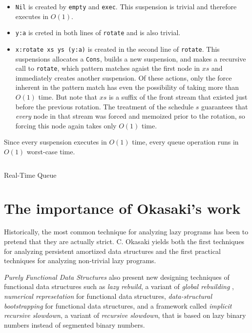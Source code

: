 \documentclass[12pt, a4paper]{article} %
\newcommand{\code}[1]{\texttt{#1}} %
\begin{document}
\begin{itemize}
  \item \code{Nil} is created by \code{empty} and \code{exec}. This suspension is trivial and therefore executes in $O(1)$.
  \item \code{y:a} is creted in both lines of \code{rotate} and is also trivial.
  \item \code{x:rotate xs ys (y:a)} is created in the second line of \code{rotate}. This suspensions allocates a \code{Cons}, builds a new suspension, and makes a recursive call to \code{rotate}, which pattern matches agaist the first node in $xs$ and immediately creates another suspension. Of these actions, only the force inherent in the pattern match has even the possibility of taking more than $O(1)$ time. But note that $xs$ is a suffix of the front stream that existed just before the previous rotation. The treatment of the schedule $s$ guarantees that \textit{every} node in that stream was forced and memoized prior to the rotation, so forcing this node again takes only $O(1)$ time.
\end{itemize}

Since every suspension executes in $O(1)$ time, every queue operation runs in $O(1)$ worst-case time.

\begin{listing}[H]
    \inputminted[breaklines=true,fontsize=\footnotesize]{haskell}{../../Chapter7/RealTimeQueue.hs}
    \caption{Real-Time Queue}
    \label{lst:Real-Time Queue}
\end{listing}





\section{The importance of Okasaki's work}%
\label{sec:importance}

Historically, the most common technique for analyzing lazy programs has been to pretend that they are actually strict.
C. Okasaki yields both the first techniques for analyzing persistent amortized data structures and the first practical techniques for analyzing non-trivial lazy programs.

\textit{Purely Functional Data Structures} also present new designing techniques of functional data structures such as \textit{lazy rebuild}, a variant of \textit{global rebuilding} \cite{ove83}, \textit{numerical represetation} for functional data structures, \textit{data-structural bootstrapping} for functional data structures, and a framework called \textit{implicit recursive slowdown}, a variant of \textit{recursive slowdown}, that is based on lazy binary numbers instead of segmented binary numbers.
\end{document}
